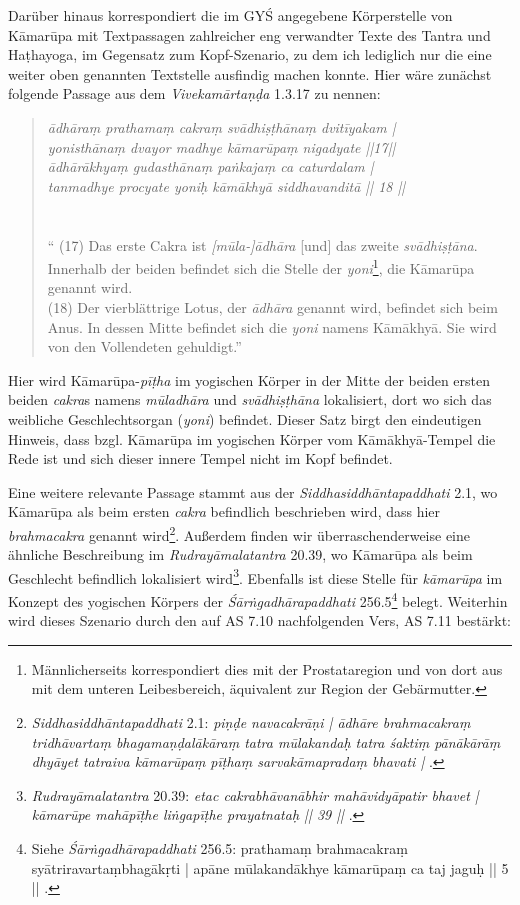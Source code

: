 \documentclass[a4paper,12pt]{article}
\begin{document}
Darüber hinaus korrespondiert die im GYŚ angegebene Körperstelle von Kāmarūpa mit Textpassagen zahlreicher eng verwandter Texte des Tantra und Haṭhayoga, im Gegensatz zum Kopf-Szenario, zu dem ich lediglich nur die eine weiter oben genannten Textstelle ausfindig machen konnte. Hier wäre zunächst folgende Passage aus dem \textit{Vivekamārtaṇḍa} 1.3.17 zu nennen:

\begin{quote} \textit{ādhāraṃ prathamaṃ cakraṃ svādhiṣṭhānaṃ dvitīyakam |\\ yonisthānaṃ dvayor madhye kāmarūpaṃ nigadyate ||17|| \\ ādhārākhyaṃ gudasthānaṃ paṅkajaṃ ca caturdalam | \\ tanmadhye procyate yoniḥ kāmākhyā siddhavanditā || 18 || } \\ \parencite[172-173]{yogatarangini}\\ \\ `` (17) Das erste Cakra ist \textit{[mūla-]ādhāra} [und] das zweite \textit{svādhiṣṭāna}. Innerhalb der beiden befindet sich die Stelle der \textit{yoni}\footnote{Männlicherseits korrespondiert dies mit der Prostataregion und von dort aus mit dem unteren Leibesbereich, äquivalent zur Region der Gebärmutter.}, die Kāmarūpa genannt wird. \\
(18) Der vierblättrige Lotus, der \textit {ādhāra} genannt wird, befindet sich beim Anus. In dessen Mitte befindet sich die \textit{yoni} namens Kāmākhyā. Sie wird von den Vollendeten gehuldigt.'' \end{quote}

    Hier wird Kāmarūpa-\textit{pīṭha} im yogischen Körper in der Mitte der beiden ersten beiden \textit{cakra}s namens \textit{mūladhāra} und \textit{svādhiṣṭhāna} lokalisiert, dort wo sich das weibliche Geschlechtsorgan (\textit{yoni}) befindet. Dieser Satz birgt den eindeutigen Hinweis, dass bzgl. Kāmarūpa im yogischen Körper vom Kāmākhyā-Tempel die Rede ist und sich dieser innere Tempel nicht im Kopf befindet. 
    
    Eine weitere relevante Passage stammt aus der \textit{Siddhasiddhāntapaddhati} 2.1, wo Kāmarūpa als beim ersten \textit{cakra} befindlich beschrieben wird, dass hier \textit{brahmacakra} genannt wird\footnote{\textit{Siddhasiddhāntapaddhati} 2.1: \textit{piṇḍe navacakrāṇi | ādhāre brahmacakraṃ tridhāvartaṃ bhagamaṇḍalākāraṃ tatra mūlakandaḥ tatra śaktiṃ pānākārāṃ dhyāyet tatraiva kāmarūpaṃ pīṭhaṃ sarvakāmapradaṃ bhavati |} \parencite[79]{ssp1954}.}. Außerdem finden wir überraschenderweise eine ähnliche Beschreibung im \textit{Rudrayāmalatantra} 20.39, wo Kāmarūpa als beim Geschlecht befindlich lokalisiert wird\footnote{\textit{Rudrayāmalatantra} 20.39: \textit{etac cakrabhāvanābhir mahāvidyāpatir bhavet | kāmarūpe mahāpīṭhe liṅgapīṭhe prayatnataḥ || 39 ||} \parencite[272]{rudrayamala1937}.}. Ebenfalls ist diese Stelle für \textit{kāmarūpa} im Konzept des yogischen Körpers der \textit{Śārṅgadhārapaddhati} 256.5\footnote{Siehe \textit{Śārṅgadhārapaddhati} 256.5: {prathamaṃ brahmacakraṃ syātriravartaṃbhagākṛti | apāne mūlakandākhye kāmarūpaṃ ca taj jaguḥ || 5 ||} \parencite[330]{peterson1888}.} belegt. Weiterhin wird dieses Szenario durch den auf AS 7.10 nachfolgenden Vers, AS 7.11 bestärkt:
\end{document}
